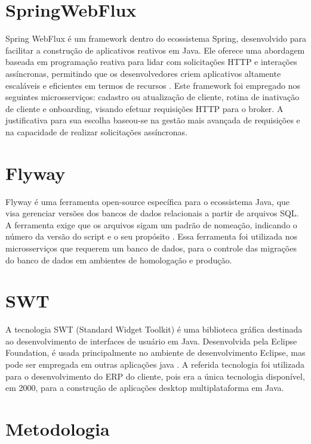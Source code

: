 \section{SpringWebFlux}

Spring WebFlux é um framework dentro do ecossistema Spring, desenvolvido para facilitar a construção de aplicativos reativos em Java. Ele oferece uma abordagem baseada em programação reativa para lidar com solicitações HTTP e interações assíncronas, permitindo que os desenvolvedores criem aplicativos altamente escaláveis e eficientes em termos de recursos \cite{spring:web:flux:explicacao}. 
Este framework foi empregado nos seguintes microsserviços: cadastro ou atualização de cliente, rotina de inativação de cliente e onboarding, visando efetuar requisições HTTP para o broker. A justificativa para sua escolha baseou-se na gestão mais avançada de requisições e na capacidade de realizar solicitações assíncronas.

\section{Flyway}

Flyway é uma ferramenta open-source específica para o ecossistema Java, que visa gerenciar versões dos bancos de dados relacionais a partir de arquivos SQL. A ferramenta exige que os arquivos sigam um padrão de nomeação, indicando o número da versão do script e o seu propósito \cite{flyway:explicacao}. 
Essa ferramenta foi utilizada nos microsserviços que requerem um banco de dados, para o controle das migrações do banco de dados em ambientes de homologação e produção.


\section{SWT}

A tecnologia SWT (Standard Widget Toolkit) é uma biblioteca gráfica destinada ao desenvolvimento de interfaces de usuário em Java. Desenvolvida pela Eclipse Foundation, é usada principalmente no ambiente de desenvolvimento Eclipse, mas pode ser empregada em outras aplicações java \cite{swt:explicacao}. 
A referida tecnologia foi utilizada para o desenvolvimento do ERP do cliente, pois era a única tecnologia disponível, em 2000, para a construção de aplicações desktop multiplataforma em Java.

\section{Metodologia}

